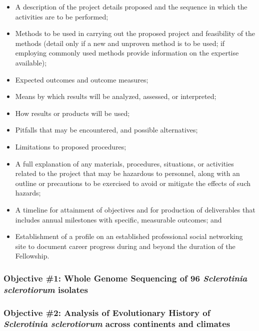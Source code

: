 \documentclass[12pt,letterpaper]{article}
\begin{document}
\begin{itemize}
  \item A description of the project details proposed and the sequence in which the
   activities are to be performed;
 
  \item Methods to be used in carrying out the proposed project and feasibility of
   the methods (detail only if a new and unproven method is to be used; if
   employing commonly used methods provide information on the expertise
   available);
 
  \item Expected outcomes and outcome measures;
  \item Means by which results will be analyzed, assessed, or interpreted;
  \item How results or products will be used;
  \item Pitfalls that may be encountered, and possible alternatives;
  \item Limitations to proposed procedures;
 
  \item A full explanation of any materials, procedures, situations, or activities
   related to the project that may be hazardous to personnel, along with an
   outline or precautions to be exercised to avoid or mitigate the effects of
   such hazards;
 
  \item A timeline for attainment of objectives and for production of deliverables
   that includes annual milestones with specific, measurable outcomes; and
 
  \item Establishment of a profile on an established professional social networking
   site to document career progress during and beyond the duration of the
   Fellowship.

\end{itemize}


\subsubsection{Objective \#1: Whole Genome Sequencing of 96 \textit{Sclerotinia sclerotiorum} isolates}

\subsubsection{Objective \#2: Analysis of Evolutionary History of \textit{Sclerotinia sclerotiorum} across continents and climates}
\end{document}
